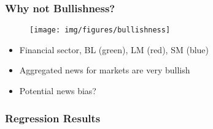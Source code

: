 \begin{frame}
    \frametitle{Why not Bullishness?}
    \vspace{-40pt}
            \begin{figure}[htb]
            \begin{center}
                \texttt{[image: img/figures/bullishness]}
            \end{center}
        \end{figure}
        \vspace{-20pt}
    \begin{itemize}
        \item {Financial sector, BL (green), LM (red), SM (blue)}
        \item Aggregated news for markets are very bullish
        \item Potential news bias?
    \end{itemize}
\end{frame}

\begin{frame}
    \frametitle{Regression Results}

\setlength{\abovecaptionskip}{15pt}
\begin{table}
\center
{}
\caption{Significance codes  0.01  0.05  0.1}
\end{table}
\end{frame}


